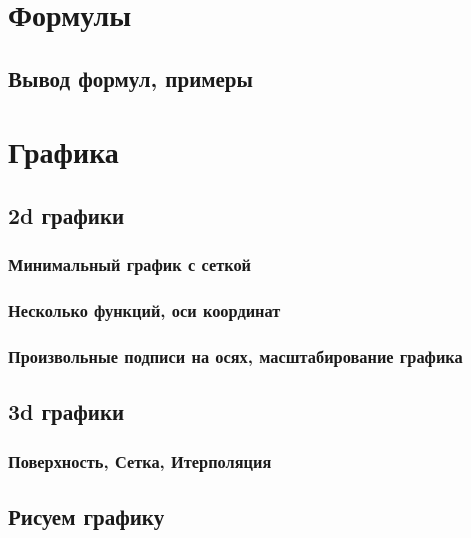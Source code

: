 \documentclass[a4paper,14pt]{book}
\begin{document}
\normalsize

\section{Формулы}

\subsection{Вывод формул, примеры}



\section{Графика}

\subsection{2d графики}

\subsubsection{Минимальный график с сеткой}



\subsubsection{Несколько функций, оси координат}



\subsubsection{Произвольные подписи на осях, масштабирование графика}



\subsection{3d графики}

\subsubsection{Поверхность, Сетка, Итерполяция}



\subsection{Рисуем графику}
\end{document}
